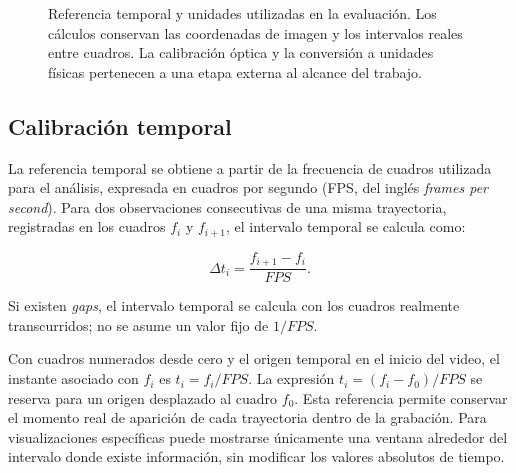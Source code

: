 \begin{figure}[H]
  \centering
  \caption{Referencia temporal y unidades utilizadas en la evaluación. Los cálculos conservan las coordenadas de imagen y los intervalos reales entre cuadros. La calibración óptica y la conversión a unidades físicas pertenecen a una etapa externa al alcance del trabajo.}
  \label{fig:calibracion}
\end{figure}

\subsection{Calibración temporal}

La referencia temporal se obtiene a partir de la frecuencia de cuadros utilizada para el análisis, expresada en cuadros por segundo (FPS, del inglés \emph{frames per second}). Para dos observaciones consecutivas de una misma trayectoria, registradas en los cuadros $f_i$ y $f_{i+1}$, el intervalo temporal se calcula como:

\[
\Delta t_i=\frac{f_{i+1}-f_i}{FPS}.
\]

Si existen \textit{gaps}, el intervalo temporal se calcula con los cuadros realmente transcurridos; no se asume un valor fijo de $1/FPS$.

Con cuadros numerados desde cero y el origen temporal en el inicio del video, el instante asociado con $f_i$ es $t_i=f_i/FPS$. La expresión $t_i=(f_i-f_0)/FPS$ se reserva para un origen desplazado al cuadro $f_0$. Esta referencia permite conservar el momento real de aparición de cada trayectoria dentro de la grabación. Para visualizaciones específicas puede mostrarse únicamente una ventana alrededor del intervalo donde existe información, sin modificar los valores absolutos de tiempo.

